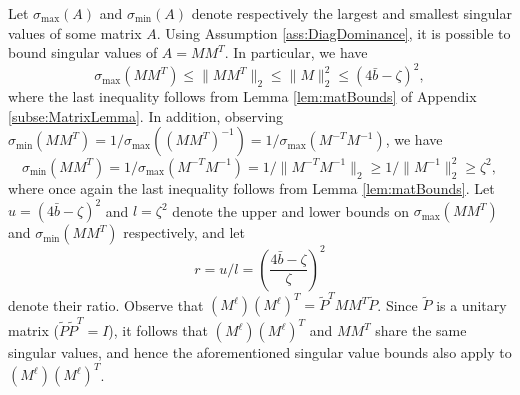 \documentclass[opre,nonblindrev]{informs3} %
\begin{document}
\begin{APPENDIX}{}
Let $\sigma_{\max}(A)$ and $\sigma_{\min}(A)$ denote respectively the largest and smallest singular values of some matrix $A$.
Using Assumption \ref{ass:DiagDominance}, it is possible to bound singular values of $A=M M^T$. In particular, we have
\[
\sigma_{\max}(M M^T) \leq \| M M^T \|_2 \leq \| M\|_2^2 \leq (4 \bar{b}  - \zeta)^2,
\]
where the last inequality follows from Lemma \ref{lem:matBounds} of Appendix \ref{subse:MatrixLemma}.
In addition, observing
$\sigma_{\min} (M M^T) = 1/\sigma_{\max}( (M M^T)^{-1}  ) = 1/ \sigma_{\max}( M^{-T} M^{-1})$, we have
\[
\sigma_{\min} (M M^T) = 1/ \sigma_{\max}( M^{-T} M^{-1}) =
1/ \| M^{-T} M^{-1} \|_2 \geq 1/   \| M^{-1} \|_2^2 \geq
\zeta^2,
\]
where once again the last inequality follows from Lemma \ref{lem:matBounds}.
Let $u=(4 \bar{b}  - \zeta)^2$ and $l=\zeta^2$ denote the upper and lower bounds on  	$\sigma_{\max}(M M^T) $ and $	\sigma_{\min}(M M^T) $ respectively, and let
\begin{equation} \label{eq:ratio}
r=u/l =  \left( \frac{4 \bar{b}  - \zeta}{\zeta} \right)^2
\end{equation}
denote their ratio.
Observe that $ (M^\ell) (M^\ell)^T =\tilde{P}^T M M^T \tilde{P}$. Since
$\tilde{P}$ is a unitary matrix
($\tilde{P} \tilde{P}^T=I$), it follows that
$(M^\ell) (M^\ell)^T$ and $M M^T$ share the same singular values, and hence the aforementioned singular value bounds   also apply to $(M^\ell) (M^\ell)^T$.


\end{APPENDIX}
\end{document}
